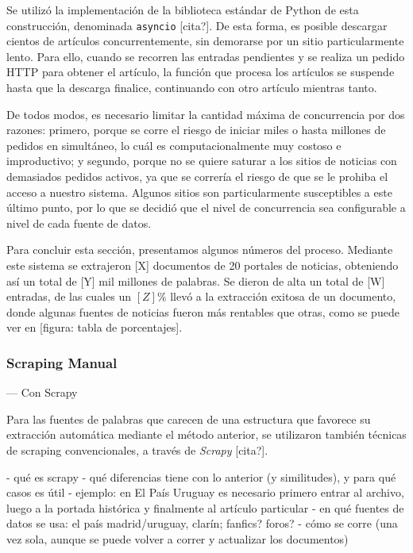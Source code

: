 Se utilizó la implementación de la biblioteca estándar de Python de esta construcción, denominada
\texttt{asyncio} [cita?]. De esta forma, es posible descargar cientos de artículos concurrentemente,
sin demorarse por un sitio particularmente lento. Para ello, cuando se recorren las entradas
pendientes y se realiza un pedido HTTP para obtener el artículo, la función que procesa los
artículos se suspende hasta que la descarga finalice, continuando con otro artículo mientras tanto.

De todos modos, es necesario limitar la cantidad máxima de concurrencia por dos razones: primero,
porque se corre el riesgo de iniciar miles o hasta millones de pedidos en simultáneo, lo cuál es
computacionalmente muy costoso e improductivo; y segundo, porque no se quiere saturar a los sitios
de noticias con demasiados pedidos activos, ya que se correría el riesgo de que se le prohiba el
acceso a nuestro sistema. Algunos sitios son particularmente susceptibles a este último punto, por
lo que se decidió que el nivel de concurrencia sea configurable a nivel de cada fuente de datos.


Para concluir esta sección, presentamos algunos números del proceso. Mediante este sistema se
extrajeron [X] documentos de 20 portales de noticias, obteniendo así un total de [Y] mil millones de
palabras. Se dieron de alta un total de [W] entradas, de las cuales un $[Z]\%$ llevó a la extracción
exitosa de un documento, donde algunas fuentes de noticias fueron más rentables que otras, como se
puede ver en [figura: tabla de porcentajes].


\subsubsection{Scraping Manual}


--- Con Scrapy

Para las fuentes de palabras que carecen de una estructura que favorece su extracción automática
mediante el método anterior, se utilizaron también técnicas de scraping convencionales, a través de
\textit{Scrapy} [cita?].

- qué es scrapy
- qué diferencias tiene con lo anterior (y similitudes), y para qué casos es útil
    - ejemplo: en El País Uruguay es necesario primero entrar al archivo, luego a la portada
      histórica y finalmente al artículo particular
- en qué fuentes de datos se usa: el país madrid/uruguay, clarín; fanfics? foros?
- cómo se corre (una vez sola, aunque se puede volver a correr y actualizar los documentos)


